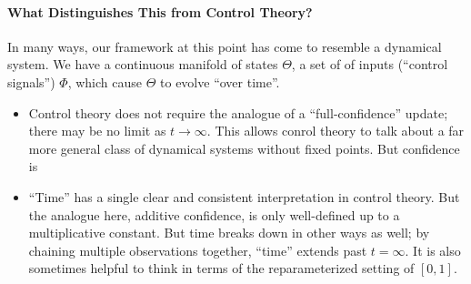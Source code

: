 \paragraph{What Distinguishes This from Control Theory?}
In many ways, our framework at this point has come to resemble a dynamical system. 
We have a continuous manifold of states $\Theta$, a set of 
	of inputs (``control signals'') $\Phi$, which cause $\Theta$ 
	to evolve ``over time''. 

\begin{itemize}
	\item Control theory does not require the analogue of a ``full-confidence'' update; there may be no limit as $t \to \infty$.
	This allows conrol theory to talk about a far more general class of dynamical systems without fixed points. 
	But confidence is 
	
	\item ``Time'' has a single clear and consistent interpretation in control theory. But the analogue here, additive confidence, is only well-defined up to a multiplicative constant. But time breaks down in other ways as well; by chaining multiple observations together, ``time'' extends past $t=\infty$.
	It is also sometimes helpful to think in terms of the reparameterized setting of $[0,1]$.
	
\end{itemize}





